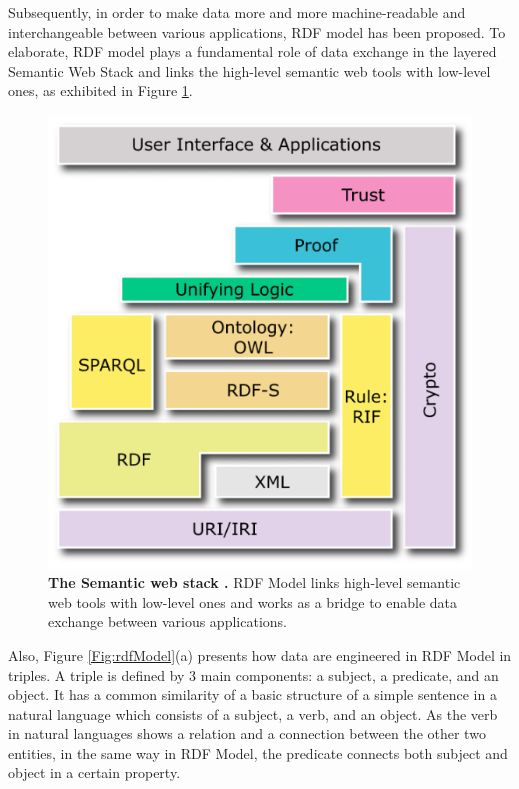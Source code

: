 Subsequently, in order to make data more and more machine-readable and interchangeable between various applications, RDF model \cite{W3C:RDF-Primer:Online} has been proposed.  To elaborate, RDF model plays a fundamental role of data exchange in the layered Semantic Web Stack and links the high-level semantic web tools with low-level ones, as exhibited in {Figure \ref{Fig:semanticWebStack}}. 
	\begin{figure}[ht]
	\begin{center}
	\setlength\belowcaptionskip{-7mm}
		\includegraphics[scale=0.5,angle=0]{images/semanticWebStack}
		\caption{\textbf{The Semantic web stack \cite{W3C:SemanticStack:Online}.} RDF Model links  high-level semantic web tools with low-level ones and works as a bridge to enable data exchange between various applications.}
		\label{Fig:semanticWebStack}
	\end{center}
\end{figure}
\par
Also, {Figure \ref{Fig:rdfModel}}(a) presents how data are engineered in RDF Model in triples. A triple is defined by 3 main components: a subject, a predicate, and an object. It has a common similarity of a basic structure of a simple sentence in a natural language which consists of a subject, a verb, and  an object. As the verb in natural languages shows a relation and a connection between the other two entities, in the same way in RDF Model, the predicate connects both subject and object in a certain property. 


